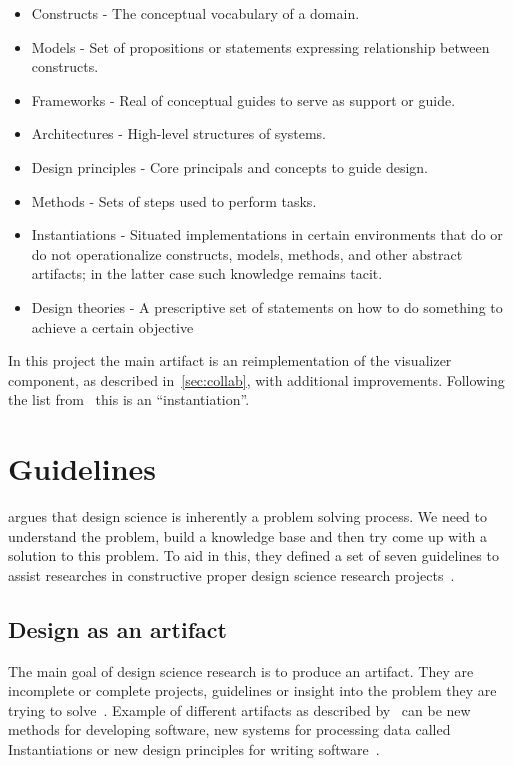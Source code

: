 \documentclass[../Main/thesis.tex]{subfiles}
\begin{document}
\begin{itemize}
\label{lst:artifacts}
    \item Constructs - The conceptual vocabulary of a domain.
    \item Models - Set of propositions or statements expressing relationship
        between constructs.
    \item Frameworks - Real of conceptual guides to serve as support or guide.
    \item Architectures - High-level structures of systems.
    \item Design principles - Core principals and concepts to guide design.
    \item Methods - Sets of steps used to perform tasks.
    \item Instantiations - Situated implementations in certain environments that do or do not
operationalize constructs, models, methods, and other abstract artifacts; in the
latter case such knowledge remains tacit.
    \item Design theories -  A prescriptive set of statements on how to do something to achieve a certain objective
\end{itemize}

In this project the main artifact is an reimplementation of the visualizer
component, as described in~\ref{sec:collab}, with additional improvements.
Following the list from~\citeauthor{Vaishnavi:2015:DSR:2807332} this is an
``instantiation''.

\section{Guidelines}%
\label{sec:guidelines}
\citeauthor{Hevner:2004:DSI:2017212.2017217} argues that design science is
inherently a problem solving process. We need to understand the problem, build
a knowledge base and then try come up with a solution to this problem. To aid in
this, they defined a set of seven guidelines to assist researches in
constructive proper design science research projects~\cite{Hevner:2004:DSI:2017212.2017217}.

\subsection*{Design as an artifact}%
\label{sub:design_as_an_artifact}
The main goal of design science research is to produce an artifact. They are
incomplete or complete projects, guidelines or insight into the problem they are
trying to solve~\cite{Hevner:2004:DSI:2017212.2017217}. Example of different
artifacts as described by~\citeauthor{Vaishnavi:2015:DSR:2807332} can be new
methods for developing software, new systems for processing data called
Instantiations or new design principles for writing
software~\cite{Vaishnavi:2015:DSR:2807332}.
\end{document}
